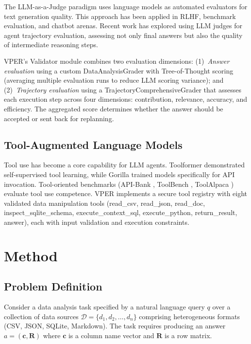 \documentclass{article}
\begin{document}
The LLM-as-a-Judge paradigm \cite{gu2024survey} uses language models as automated evaluators for text generation quality.
This approach has been applied in RLHF, benchmark evaluation, and chatbot arenas.
Recent work has explored using LLM judges for agent trajectory evaluation, assessing not only final answers but also the quality of intermediate reasoning steps.

VPER's Validator module combines two evaluation dimensions:
(1)~\emph{Answer evaluation} using a custom DataAnalysisGrader with Tree-of-Thought scoring (averaging multiple evaluation runs to reduce LLM scoring variance);
and (2)~\emph{Trajectory evaluation} using a TrajectoryComprehensiveGrader that assesses each execution step across four dimensions: contribution, relevance, accuracy, and efficiency.
The aggregated score determines whether the answer should be accepted or sent back for replanning.

\subsection{Tool-Augmented Language Models}

Tool use has become a core capability for LLM agents.
Toolformer \cite{schick2023toolformer} demonstrated self-supervised tool learning, while Gorilla \cite{patil2024gorilla} trained models specifically for API invocation.
Tool-oriented benchmarks (API-Bank \cite{li2023api}, ToolBench \cite{qintoolllm}, ToolAlpaca \cite{tang2023toolalpaca}) evaluate tool use competence.
VPER implements a secure tool registry with eight validated data manipulation tools (read\_csv, read\_json, read\_doc, inspect\_sqlite\_schema, execute\_context\_sql, execute\_python, return\_result, answer), each with input validation and execution constraints.


\section{Method}

\subsection{Problem Definition}

Consider a data analysis task specified by a natural language query $q$ over a collection of data sources $\mathcal{D} = \{d_1, d_2, \dots, d_n\}$ comprising heterogeneous formats (CSV, JSON, SQLite, Markdown).
The task requires producing an answer $a = (\mathbf{c}, \mathbf{R})$ where $\mathbf{c}$ is a column name vector and $\mathbf{R}$ is a row matrix.
\end{document}
